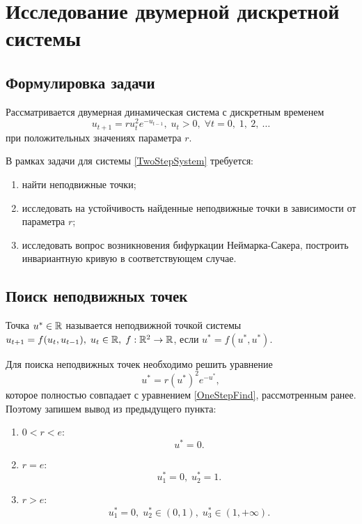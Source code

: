 \section{Исследование двумерной дискретной системы}
        \subsection{Формулировка задачи}
            Рассматривается двумерная динамическая система с дискретным временем
            \begin{equation} \label{TwoStepSystem}
                u_{t+1} = r u_t^2 e^{-u_{t-1}},\; u_t > 0,\; \forall t = 0,\; 1,\: 2,\: \dots
            \end{equation}
            при положительных значениях параметра $r$.

            В рамках задачи для системы \ref{TwoStepSystem} требуется:
            \begin{enumerate}
                \item
                    найти неподвижные точки;
                \item
                    исследовать на устойчивость найденные неподвижные точки в зависимости от параметра $r$;
                \item
                    исследовать вопрос возникновения бифуркации Неймарка-Сакера, построить инвариантную кривую в соответствующем случае.
            \end{enumerate}
        \subsection{Поиск неподвижных точек}
            \begin{definition}
                Точка $u^*\in\mathbb{R}$ называется неподвижной точкой системы $u_{t+1}=f(u_t,u_{t-1}),\; u_t\in\mathbb{R},\; f:\mathbb{R}^2\rightarrow\mathbb{R}$, если $u^* = f(u^*,u^*)$.
            \end{definition}

            Для поиска неподвижных точек необходимо решить уравнение
            $$
                u^* = r (u^*)^2 e^{-u^*},
            $$
            которое полностью совпадает с уравнением \ref{OneStepFind}, рассмотренным ранее. Поэтому запишем вывод из предыдущего пункта:
            \begin{enumerate}
                \item
                $0 < r < e$:
                $$u^* = 0.$$
                \item
                $r = e$:
                $$u^*_1 = 0, \; u^*_2 = 1.$$
                \item
                $r > e$:
                $$u^*_1 = 0, \; u^*_2 \in (0, 1), \; u^*_3 \in (1, +\infty).$$
            \end{enumerate}
